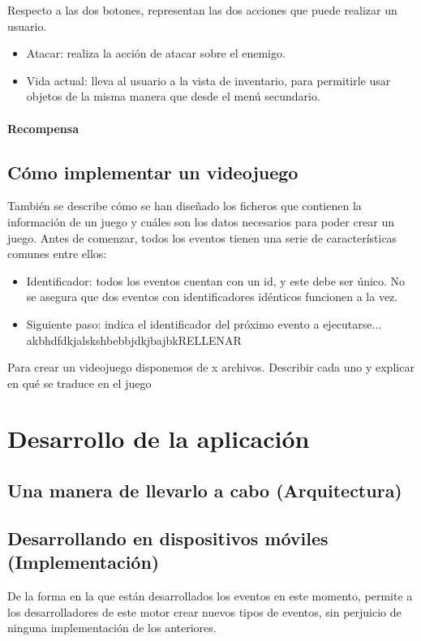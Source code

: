 Respecto a las dos botones, representan las dos acciones que puede realizar un usuario.
\begin{itemize}
	\item Atacar: realiza la acción de atacar sobre el enemigo.
	\item Vida actual: lleva al usuario a la vista de inventario, para permitirle usar objetos de la misma manera que desde el menú secundario.
\end{itemize}



\subsubsection{Recompensa}

\section{Cómo implementar un videojuego} \label{developmentGuide}

También se describe cómo se han diseñado los ficheros que contienen la información de un juego y cuáles son los datos necesarios para poder crear un juego.
Antes de comenzar, todos los eventos tienen una serie de características comunes entre ellos:

\begin{itemize}
	\item Identificador: todos los eventos cuentan con un id, y este debe ser único. No se asegura que dos eventos con identificadores idénticos funcionen a la vez.
	\item Siguiente paso: indica el identificador del próximo evento a ejecutarse...
	akbhdfdkjalskshbebbjdkjbajbkRELLENAR
\end{itemize}

Para crear un videojuego disponemos de x archivos.
Describir cada uno y explicar en qué se traduce en el juego



\chapter{Desarrollo de la aplicación} \label{applicationImplementation}

\section{Una manera de llevarlo a cabo (Arquitectura)}

\section{Desarrollando en dispositivos móviles (Implementación)}

De la forma en la que están desarrollados los eventos en este momento, permite a los desarrolladores de este motor crear nuevos tipos de eventos, sin perjuicio de ninguna implementación de los anteriores.